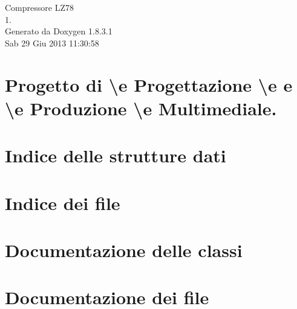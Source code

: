\documentclass{book}
\begin{document}
\hypersetup{pageanchor=false,citecolor=blue}
\begin{titlepage}
\vspace*{7cm}
\begin{center}
{\Large Compressore L\-Z78 \\[1ex]\large 1. }\\
\vspace*{1cm}
{\large Generato da Doxygen 1.8.3.1}\\
\vspace*{0.5cm}
{\small Sab 29 Giu 2013 11:30:58}\\
\end{center}
\end{titlepage}
\clearemptydoublepage
{}
\tableofcontents
\clearemptydoublepage
{}
\hypersetup{pageanchor=true,citecolor=blue}
\chapter{Progetto di \textbackslash{}e Progettazione \textbackslash{}e e \textbackslash{}e Produzione \textbackslash{}e Multimediale.}
\label{index}\hypertarget{index}{}
\chapter{Indice delle strutture dati}

\chapter{Indice dei file}

\chapter{Documentazione delle classi}





\chapter{Documentazione dei file}













\printindex
\end{document}
